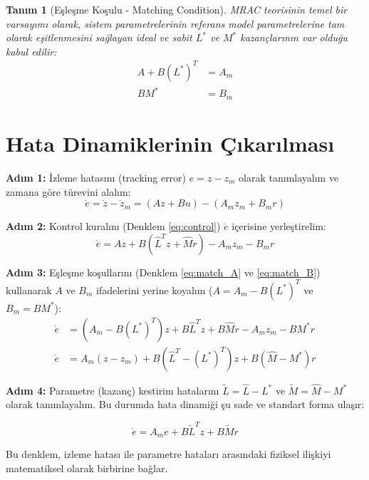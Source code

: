\documentclass[12pt,a4paper]{article}
\newtheorem{definition}{Tanım}
\begin{document}
\begin{definition}[Eşleşme Koşulu - Matching Condition]
MRAC teorisinin temel bir varsayımı olarak, sistem parametrelerinin referans model parametrelerine tam olarak eşitlenmesini sağlayan ideal ve sabit $L^*$ ve $M^*$ kazançlarının var olduğu kabul edilir:
\begin{align}
    A + B (L^*)^T &= A_m \label{eq:match_A} \\
    B M^* &= B_m \label{eq:match_B}
\end{align}
\end{definition}

\section{Hata Dinamiklerinin Çıkarılması}
\textbf{Adım 1:} İzleme hatasını (tracking error) $e = z - z_m$ olarak tanımlayalım ve zamana göre türevini alalım:
\begin{equation}
    \dot{e} = \dot{z} - \dot{z}_m = (A z + B u) - (A_m z_m + B_m r)
\end{equation}

\textbf{Adım 2:} Kontrol kuralını (Denklem \ref{eq:control}) $\dot{e}$ içerisine yerleştirelim:
\begin{equation}
    \dot{e} = A z + B (\hat{L}^T z + \hat{M} r) - A_m z_m - B_m r
\end{equation}

\textbf{Adım 3:} Eşleşme koşullarını (Denklem \ref{eq:match_A} ve \ref{eq:match_B}) kullanarak $A$ ve $B_m$ ifadelerini yerine koyalım ($A = A_m - B (L^*)^T$ ve $B_m = B M^*$):
\begin{align}
    \dot{e} &= (A_m - B (L^*)^T) z + B \hat{L}^T z + B \hat{M} r - A_m z_m - B M^* r \nonumber \\
    \dot{e} &= A_m (z - z_m) + B (\hat{L}^T - (L^*)^T) z + B (\hat{M} - M^*) r
\end{align}

\textbf{Adım 4:} Parametre (kazanç) kestirim hatalarını $\tilde{L} = \hat{L} - L^*$ ve $\tilde{M} = \hat{M} - M^*$ olarak tanımlayalım. Bu durumda hata dinamiği şu sade ve standart forma ulaşır:
\begin{mdframed}[backgroundcolor=blue!5, linecolor=blue!60!black, roundcorner=5pt]
\begin{equation}
    \dot{e} = A_m e + B \tilde{L}^T z + B \tilde{M} r
    \label{eq:error_dyn}
\end{equation}
\end{mdframed}
Bu denklem, izleme hatası ile parametre hataları arasındaki fiziksel ilişkiyi matematiksel olarak birbirine bağlar.
\end{document}
